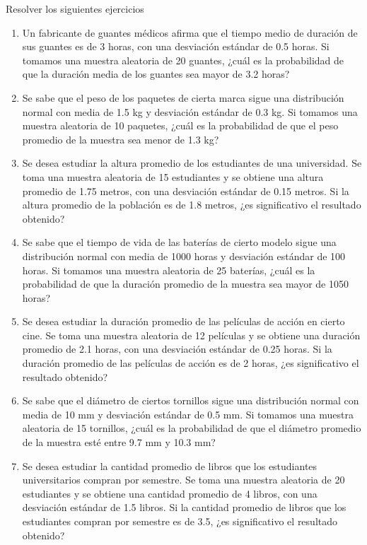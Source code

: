 \begin{Ejer} Resolver los siguientes ejercicios

\begin{enumerate}
    \item Un fabricante de guantes médicos afirma que el tiempo medio de duración de sus guantes es de 3 horas, con una desviación estándar de 0.5 horas. Si tomamos una muestra aleatoria de 20 guantes, ¿cuál es la probabilidad de que la duración media de los guantes sea mayor de 3.2 horas?
    \item Se sabe que el peso de los paquetes de cierta marca sigue una distribución normal con media de 1.5 kg y desviación estándar de 0.3 kg. Si tomamos una muestra aleatoria de 10 paquetes, ¿cuál es la probabilidad de que el peso promedio de la muestra sea menor de 1.3 kg?
    \item Se desea estudiar la altura promedio de los estudiantes de una universidad. Se toma una muestra aleatoria de 15 estudiantes y se obtiene una altura promedio de 1.75 metros, con una desviación estándar de 0.15 metros. Si la altura promedio de la población es de 1.8 metros, ¿es significativo el resultado obtenido?
    \item Se sabe que el tiempo de vida de las baterías de cierto modelo sigue una distribución normal con media de 1000 horas y desviación estándar de 100 horas. Si tomamos una muestra aleatoria de 25 baterías, ¿cuál es la probabilidad de que la duración promedio de la muestra sea mayor de 1050 horas?
    \item Se desea estudiar la duración promedio de las películas de acción en cierto cine. Se toma una muestra aleatoria de 12 películas y se obtiene una duración promedio de 2.1 horas, con una desviación estándar de 0.25 horas. Si la duración promedio de las películas de acción es de 2 horas, ¿es significativo el resultado obtenido?
    \item Se sabe que el diámetro de ciertos tornillos sigue una distribución normal con media de 10 mm y desviación estándar de 0.5 mm. Si tomamos una muestra aleatoria de 15 tornillos, ¿cuál es la probabilidad de que el diámetro promedio de la muestra esté entre 9.7 mm y 10.3 mm?
    \item Se desea estudiar la cantidad promedio de libros que los estudiantes universitarios compran por semestre. Se toma una muestra aleatoria de 20 estudiantes y se obtiene una cantidad promedio de 4 libros, con una desviación estándar de 1.5 libros. Si la cantidad promedio de libros que los estudiantes compran por semestre es de 3.5, ¿es significativo el resultado obtenido?

\end{enumerate}
\end{Ejer}
